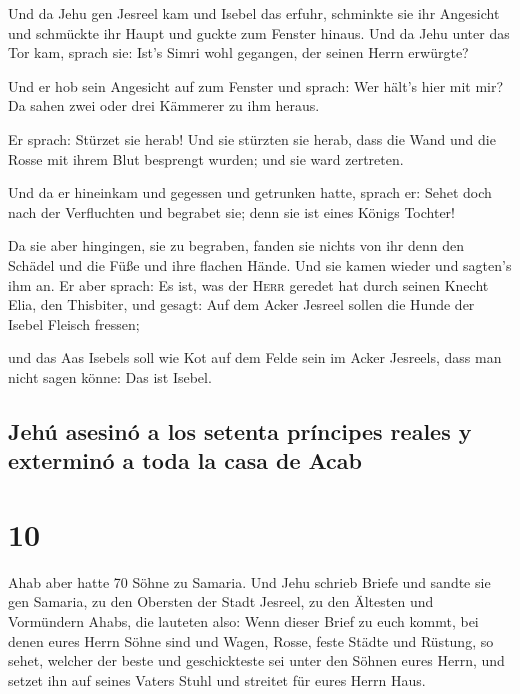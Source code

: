  Und da Jehu gen Jesreel kam und Isebel das erfuhr,
schminkte sie ihr Angesicht und schmückte ihr Haupt und guckte zum
Fenster hinaus.  Und da Jehu unter das Tor kam, sprach
sie: Ist's Simri wohl gegangen, der seinen Herrn erwürgte?

 Und er hob sein Angesicht auf zum Fenster und sprach:
Wer hält's hier mit mir? Da sahen zwei oder drei Kämmerer zu ihm heraus.

 Er sprach: Stürzet sie herab! Und sie stürzten sie
herab, dass die Wand und die Rosse mit ihrem Blut besprengt wurden; und
sie ward zertreten.

 Und da er hineinkam und gegessen und getrunken hatte,
sprach er: Sehet doch nach der Verfluchten und begrabet sie; denn sie
ist eines Königs Tochter!

 Da sie aber hingingen, sie zu begraben, fanden sie
nichts von ihr denn den Schädel und die Füße und ihre flachen Hände.
 Und sie kamen wieder und sagten's ihm an. Er aber
sprach: Es ist, was der \textsc{Herr} geredet hat durch seinen Knecht
Elia, den Thisbiter, und gesagt: Auf dem Acker Jesreel sollen die Hunde
der Isebel Fleisch fressen;

 und das Aas Isebels soll wie Kot auf dem Felde sein im
Acker Jesreels, dass man nicht sagen könne: Das ist Isebel.

\hypertarget{jehuxfa-asesinuxf3-a-los-setenta-pruxedncipes-reales-y-exterminuxf3-a-toda-la-casa-de-acab}{%
\subsection{Jehú asesinó a los setenta príncipes reales y exterminó a
toda la casa de
Acab}\label{jehuxfa-asesinuxf3-a-los-setenta-pruxedncipes-reales-y-exterminuxf3-a-toda-la-casa-de-acab}}

\hypertarget{section-9}{%
\section{10}\label{section-9}}

 Ahab aber hatte 70 Söhne zu Samaria. Und Jehu schrieb
Briefe und sandte sie gen Samaria, zu den Obersten der Stadt Jesreel, zu
den Ältesten und Vormündern Ahabs, die lauteten also: 
Wenn dieser Brief zu euch kommt, bei denen eures Herrn Söhne sind und
Wagen, Rosse, feste Städte und Rüstung,  so sehet, welcher
der beste und geschickteste sei unter den Söhnen eures Herrn, und setzet
ihn auf seines Vaters Stuhl und streitet für eures Herrn Haus.

